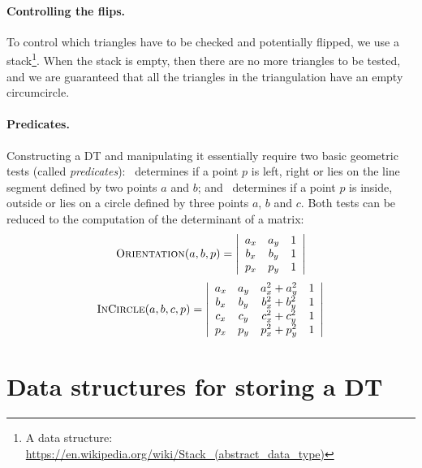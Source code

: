 \paragraph{Controlling the flips.}
To control which triangles have to be checked and potentially flipped, we use a stack\footnote{A data structure: \url{https://en.wikipedia.org/wiki/Stack_(abstract_data_type)}}. 
When the stack is empty, then there are no more triangles to be tested, and we are guaranteed that all the triangles in the triangulation have an empty circumcircle.


\paragraph{Predicates.}
Constructing a DT and manipulating it essentially require two basic geometric tests (called \emph{predicates}): \Orient\ determines if a point $p$ is left, right or lies on the line segment defined by two points $a$ and $b$; and \Incircle\ determines if a point $p$ is inside, outside or lies on a circle defined by three points $a$, $b$ and $c$. 
Both tests can be reduced to the computation of the determinant of a matrix:
\begin{equation}
  \textrm{O}\textsc{rientation}(a, b, p) = 
  \left| 
  \begin{array}{cccc}
    a_{x} & a_{y} & 1 \\
    b_{x} & b_{y} & 1 \\
    p_{x} & p_{y} & 1 
  \end{array} 
  \right| 
\end{equation}
\begin{equation}
  \textrm{I}\textsc{n}\textrm{C}\textsc{ircle}(a, b, c, p) = 
  \left| 
  \begin{array}{ccccc}
    a_{x} & a_{y} & a^{2}_{x} + a^{2}_{y} & 1 \\
    b_{x} & b_{y} & b^{2}_{x} + b^{2}_{y} & 1 \\
    c_{x} & c_{y} & c^{2}_{x} + c^{2}_{y} & 1 \\
    p_{x} & p_{y} & p^{2}_{x} + p^{2}_{y} & 1 
  \end{array} 
  \right|
\label{eq:insphere}
\end{equation}


\section{Data structures for storing a DT}

